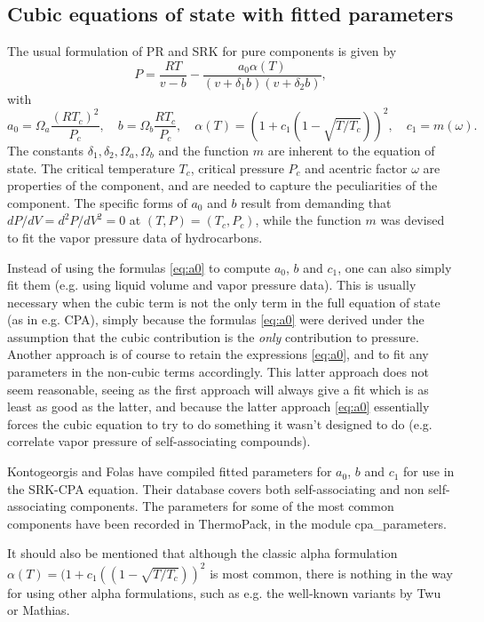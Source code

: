 \documentclass[english]{../thermomemo/thermomemo}
\newcommand{\lp}{\left(}
\newcommand{\rp}{\right)}
\begin{document}
\subsection{Cubic equations of state with fitted parameters} \label{subsec:fitted parameters}
The usual formulation of PR and SRK for pure components is given by
$$
P = \frac{RT}{v-b}-\frac{a_0 \alpha(T)}{(v+\delta_1 b)(v+\delta_2 b)},
$$
with
\begin{equation}
\label{eq:a0}
  a_0 = \Omega_a \frac{(RT_c)^2}{P_c}, \quad b = \Omega_b \frac{RT_c}{P_c}, \quad \alpha(T) = \lp 1+c_1(1-\sqrt{T/T_c}) \rp^2, \quad c_1 = m(\omega).
\end{equation}
The constants $\delta_1, \delta_2, \Omega_a, \Omega_b$ and the function $m$ are inherent to the equation of state. The critical temperature $T_c$, critical pressure $P_c$ and acentric factor $\omega$ are properties of the component, and are needed to capture the peculiarities of the component. The specific forms of $a_0$ and $b$ result from demanding that $dP/dV = d^2P/dV^2 = 0$ at $(T,P) = (T_c,P_c)$, while the function $m$ was devised to fit the vapor pressure data of hydrocarbons.

Instead of using the formulas \eqref{eq:a0} to compute $a_0$, $b$ and $c_1$, one can also simply fit them (e.g. using liquid volume and vapor pressure data). This is usually necessary when the cubic term is not the only term in the full equation of state (as in e.g. CPA), simply because the formulas \eqref{eq:a0} were derived under the assumption that the cubic contribution is the \textit{only} contribution to pressure. Another approach is of course to retain the expressions \eqref{eq:a0}, and to fit any parameters in the non-cubic terms accordingly. This latter approach does not seem reasonable, seeing as the first approach will always give a fit which is as least as good as the latter, and because the latter approach \eqref{eq:a0} essentially forces the cubic equation to try to do something it wasn't designed to do (e.g. correlate vapor pressure of self-associating compounds).

Kontogeorgis and Folas \cite{Kontogeorgis10} have compiled fitted parameters for $a_0$, $b$ and $c_1$ for use in the SRK-CPA equation. Their database covers both self-associating and non self-associating components. The parameters for some of the most common components have been recorded in ThermoPack, in the module cpa\_parameters.

It should also be mentioned that although the classic alpha formulation $\alpha(T) = (1+c_1((1-\sqrt{T/T_c}))^2$ is most common, there is nothing in the way for using other alpha formulations, such as e.g. the well-known variants by Twu or Mathias.
\end{document}
